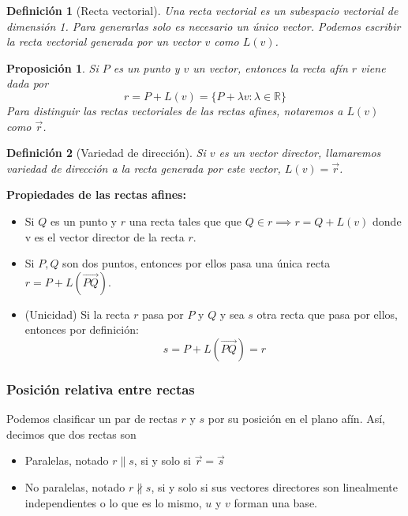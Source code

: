 \documentclass[11pt, a4paper, titlepage]{article}
\makeatletter
\renewenvironment{proof}[1][\proofname] {\vspace{-15pt}\par\pushQED{\qed}\normalfont\topsep6\p@\@plus6\p@\relax\trivlist\item[\hskip\labelsep\it#1\@addpunct{.}]\ignorespaces}{\popQED\endtrivlist\@endpefalse}
\newcommand{\R}{\mathbb{R}}
\renewcommand{\vec}{\overrightarrow}
\renewenvironment{proof}[1][\proofname] {\par\pushQED{\qed}\normalfont\topsep6\p@\@plus6\p@\relax\trivlist\item[\hskip\labelsep\itshape\sffamily#1\@addpunct{.}]\ignorespaces}{\popQED\endtrivlist\@endpefalse}
\theoremstyle{theorem-style}
\newtheorem{nprop}{Proposición}[section]
\theoremstyle{definition-style}
\newtheorem{ndef}{Definición}[section]
\theoremstyle{remark-style}
\theoremstyle{example-style}
\makeatother
\begin{document}
\begin{ndef}[Recta vectorial]
  Una recta vectorial es un subespacio vectorial de dimensión 1. Para generarlas solo es necesario un único vector. Podemos escribir la \textit{recta vectorial generada por un vector} $v$ como $L(v)$.
\end{ndef}

\begin{nprop}
  Si $P$ es un punto y $v$ un vector, entonces la recta afín $r$ viene dada por
  \[
    r = P+L(v) = \{P + \lambda v : \lambda \in \R\}
  \]
  Para distinguir las rectas vectoriales de las rectas afines, notaremos a $L(v)$ como $\vec{r}$.
\end{nprop}
\begin{ndef}[Variedad de dirección]
  Si $v$ es un \textit{vector director}, llamaremos \textit{variedad de dirección} a la recta generada por este vector, $L(v) = \vec{r}$.
\end{ndef}

\textbf{Propiedades de las rectas afines:}
\begin{itemize}
\item Si $Q$ es un punto y $r$ una recta tales que que $Q\in r \implies r = Q +L(v)$ donde v es el vector director de la recta $r$.
\item Si $P,Q$ son dos puntos, entonces por ellos pasa una única recta $r = P +L(\overrightarrow{PQ})$. \\
  \begin{proof}
    (Unicidad) Si la recta $r$ pasa por $P$ y $Q$ y sea $s$ otra recta que pasa por ellos, entonces por definición:
    \[
      s = P+L(\overrightarrow{PQ}) = r
    \]
  \end{proof}
\end{itemize}

\subsubsection{Posición relativa entre rectas}

Podemos clasificar un par de rectas $r$ y $s$ por su posición en el plano afín. Así, decimos que dos rectas son

\begin{itemize}
\item Paralelas, notado $r\parallel s$, si y solo si $\vec{r} = \vec{s}$
\item No paralelas, notado $r\nparallel s$, si y solo si sus vectores directores son linealmente independientes o lo que es lo mismo, $u$ y $v$ forman una base.
\end{itemize}
\end{document}
